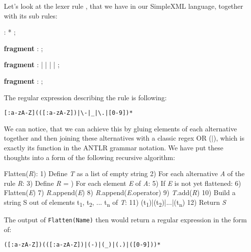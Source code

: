 \pagebreak

Let's look at the lexer rule , that we have in our SimpleXML language, together with its sub rules:

\begin{antlr}
	         :    * ;

	\textbf{fragment}
	        :   \regex{[0-9]} ;

	\textbf{fragment}
	     :   
             |   \literal{-} | \literal{{\_}} | 
             |   
             ;

	\textbf{fragment}
	:   \regex{[:a-zA-Z]} ;
\end{antlr}

The regular expression describing the  rule is following:

\begin{center}
	\texttt{[:a-zA-Z](([:a-zA-Z])|\textbackslash-|{\_}|\textbackslash.|[0-9])*}
\end{center}

We can notice, that we can achieve this by gluing elements of each alternative together and then joining these alternatives with a classic regex OR ($|$), which is exactly its function in the ANTLR grammar notation.
We have put these thoughts into a form of the following recursive algorithm:

\begin{antlr}
	Flatten(\textit{R}):
	1) Define \textit{T} as a list of empty string
	2) For each alternative \textit{A} of the rule \textit{R}:
	3)     Define \textit{R} = \ap{})     For each element \textit{E} of \textit{A}:
	5)         If \textit{E} is not yet flattened:
	6)             Flatten(\textit{E})
	7)         \textit{R}.append(\textit{E})
	8)         \textit{R}.append(\textit{E}.operator)
	9)     \textit{T}.add(\textit{R})
	10) Build a string S out of elements t\textsubscript{1}, t\textsubscript{2}, ... t\textsubscript{n} of \textit{T}:
	11)     (t\textsubscript{1})|(t\textsubscript{2})|...|(t\textsubscript{n})
	12) Return \textit{S}
\end{antlr}

The output of \texttt{Flatten(Name)} then would return a regular expression in the form of:

\begin{center}
	\texttt{([:a-zA-Z])(([:a-zA-Z])|(-)|({\_})|(.)|([0-9]))*}
\end{center}

